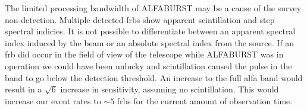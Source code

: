 \documentclass[a4paper,fleqn,usenatbib]{mnras}
\begin{document}
%

The limited processing bandwidth of ALFABURST may be a cause of the survey
non-detection. Multiple detected \glspl{frb} show apparent scintillation and
step spectral indicies. It is not possible to differentiate between an
apparent spectral index induced by the beam or an absolute spectral index from
the source. If an \gls{frb} did occur in the field of view of the telescope
while ALFABURST was in operation we could have been unlucky and scintillation
caused the pulse in the band to go below the detection threshold. An increase to
the full \gls{alfa} band would result in a $\sqrt{6}$ increase in sensitivity,
assuming no scintillation. This would increase our event rates to $\sim 5$
\glspl{frb} for the current amount of observation time.
\end{document}
